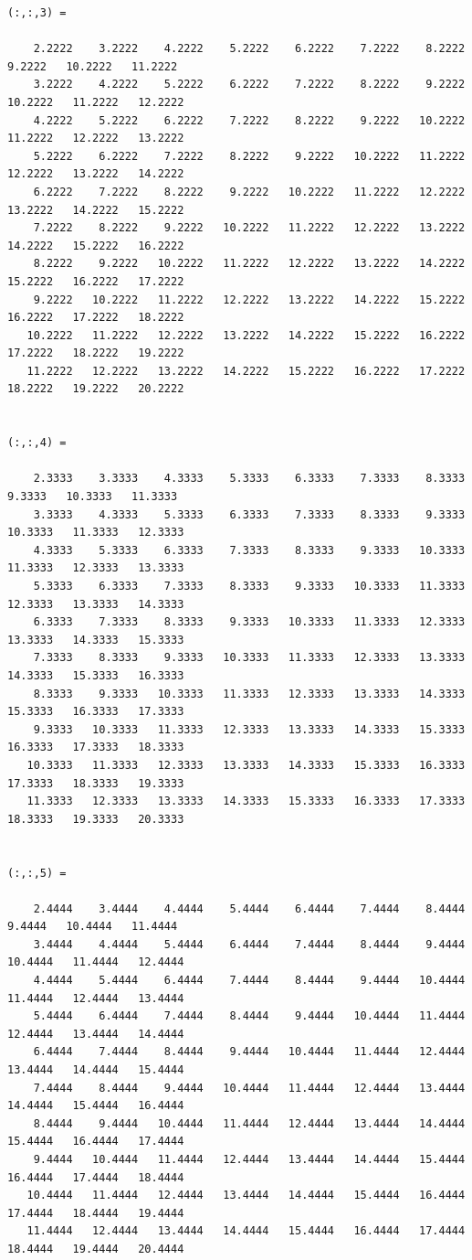 \documentclass[
]{book}
\begin{document}
\begin{verbatim}
(:,:,3) =

    2.2222    3.2222    4.2222    5.2222    6.2222    7.2222    8.2222    9.2222   10.2222   11.2222
    3.2222    4.2222    5.2222    6.2222    7.2222    8.2222    9.2222   10.2222   11.2222   12.2222
    4.2222    5.2222    6.2222    7.2222    8.2222    9.2222   10.2222   11.2222   12.2222   13.2222
    5.2222    6.2222    7.2222    8.2222    9.2222   10.2222   11.2222   12.2222   13.2222   14.2222
    6.2222    7.2222    8.2222    9.2222   10.2222   11.2222   12.2222   13.2222   14.2222   15.2222
    7.2222    8.2222    9.2222   10.2222   11.2222   12.2222   13.2222   14.2222   15.2222   16.2222
    8.2222    9.2222   10.2222   11.2222   12.2222   13.2222   14.2222   15.2222   16.2222   17.2222
    9.2222   10.2222   11.2222   12.2222   13.2222   14.2222   15.2222   16.2222   17.2222   18.2222
   10.2222   11.2222   12.2222   13.2222   14.2222   15.2222   16.2222   17.2222   18.2222   19.2222
   11.2222   12.2222   13.2222   14.2222   15.2222   16.2222   17.2222   18.2222   19.2222   20.2222


(:,:,4) =

    2.3333    3.3333    4.3333    5.3333    6.3333    7.3333    8.3333    9.3333   10.3333   11.3333
    3.3333    4.3333    5.3333    6.3333    7.3333    8.3333    9.3333   10.3333   11.3333   12.3333
    4.3333    5.3333    6.3333    7.3333    8.3333    9.3333   10.3333   11.3333   12.3333   13.3333
    5.3333    6.3333    7.3333    8.3333    9.3333   10.3333   11.3333   12.3333   13.3333   14.3333
    6.3333    7.3333    8.3333    9.3333   10.3333   11.3333   12.3333   13.3333   14.3333   15.3333
    7.3333    8.3333    9.3333   10.3333   11.3333   12.3333   13.3333   14.3333   15.3333   16.3333
    8.3333    9.3333   10.3333   11.3333   12.3333   13.3333   14.3333   15.3333   16.3333   17.3333
    9.3333   10.3333   11.3333   12.3333   13.3333   14.3333   15.3333   16.3333   17.3333   18.3333
   10.3333   11.3333   12.3333   13.3333   14.3333   15.3333   16.3333   17.3333   18.3333   19.3333
   11.3333   12.3333   13.3333   14.3333   15.3333   16.3333   17.3333   18.3333   19.3333   20.3333


(:,:,5) =

    2.4444    3.4444    4.4444    5.4444    6.4444    7.4444    8.4444    9.4444   10.4444   11.4444
    3.4444    4.4444    5.4444    6.4444    7.4444    8.4444    9.4444   10.4444   11.4444   12.4444
    4.4444    5.4444    6.4444    7.4444    8.4444    9.4444   10.4444   11.4444   12.4444   13.4444
    5.4444    6.4444    7.4444    8.4444    9.4444   10.4444   11.4444   12.4444   13.4444   14.4444
    6.4444    7.4444    8.4444    9.4444   10.4444   11.4444   12.4444   13.4444   14.4444   15.4444
    7.4444    8.4444    9.4444   10.4444   11.4444   12.4444   13.4444   14.4444   15.4444   16.4444
    8.4444    9.4444   10.4444   11.4444   12.4444   13.4444   14.4444   15.4444   16.4444   17.4444
    9.4444   10.4444   11.4444   12.4444   13.4444   14.4444   15.4444   16.4444   17.4444   18.4444
   10.4444   11.4444   12.4444   13.4444   14.4444   15.4444   16.4444   17.4444   18.4444   19.4444
   11.4444   12.4444   13.4444   14.4444   15.4444   16.4444   17.4444   18.4444   19.4444   20.4444



\end{verbatim}
\end{document}
